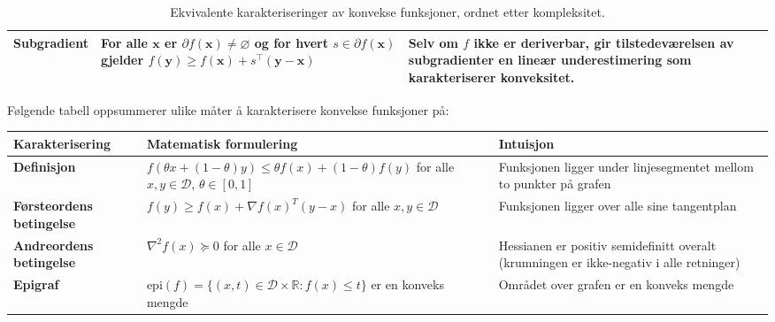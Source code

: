 \begin{table}[H]
\begin{tabularx}{\textwidth}{|>{\raggedright\arraybackslash}X|>{\raggedright\arraybackslash}X|>{\raggedright\arraybackslash}X|}
		\hline
		Subgradient                 &
		For alle \( \symbf{x} \) er \( \partial f(\symbf{x}) \neq \varnothing \) og for hvert \( s \in \partial f(\symbf{x}) \) gjelder
		\( f(\symbf{y}) \ge f(\symbf{x}) + s^\top (\symbf{y}-\symbf{x}) \)
		                            & Selv om \( f \) ikke er deriverbar, gir tilstedeværelsen av subgradienter en lineær underestimering som karakteriserer konveksitet.
		\\
		\hline
	\end{tabularx}
	\caption{Ekvivalente karakteriseringer av konvekse funksjoner, ordnet etter kompleksitet.}
	\label{tab:convex_equivalence}
\end{table}

Følgende tabell oppsummerer ulike måter å karakterisere konvekse funksjoner på:

\begin{table}[H]
	\centering
	\begin{tabular}{|p{3cm}|p{6cm}|p{5cm}|}
		\hline
		\rowcolor{blue!15}
		\textbf{Karakterisering}                                        & \textbf{Matematisk formulering} & \textbf{Intuisjon} \\
		\hline
		\textbf{Definisjon}                                             &
		$f(\theta x + (1-\theta)y) \leq \theta f(x) + (1-\theta)f(y)$ \newline
		for alle $x,y \in \mathcal{D}$, $\theta \in [0,1]$              &
		Funksjonen ligger under linjesegmentet mellom to punkter på grafen                                                     \\
		\hline
		\textbf{Førsteordens betingelse}                                &
		$f(y) \geq f(x) + \nabla f(x)^T(y-x)$ \newline
		for alle $x,y \in \mathcal{D}$                                  &
		Funksjonen ligger over alle sine tangentplan                                                                           \\
		\hline
		\textbf{Andreordens betingelse}                                 &
		$\nabla^2 f(x) \succeq 0$ for alle $x \in \mathcal{D}$          &
		Hessianen er positiv semidefinitt overalt (krumningen er ikke-negativ i alle retninger)                                \\
		\hline
		\textbf{Epigraf}                                                &
		$\text{epi}(f) = \{(x,t) \in \mathcal{D} \times \mathbb{R} : f(x) \leq t\}$ \newline
		er en konveks mengde                                            &
		Området over grafen er en konveks mengde                                                                               \\

\end{tabular}
\end{table}
